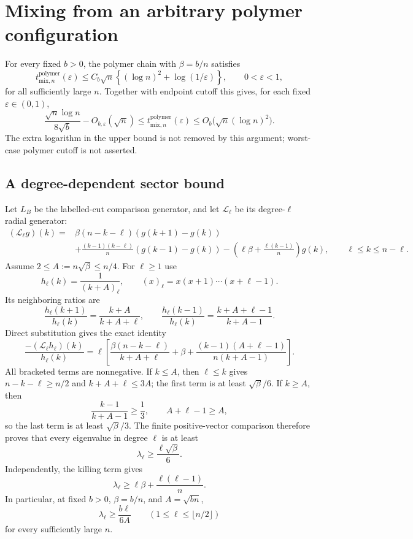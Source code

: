 
\section{Mixing from an arbitrary polymer configuration}\label{sec:full-polymer-tv}
\begin{theorem}\label{thm:full-polymer-tv-upper-new}
For every fixed $b>0$, the polymer chain with $\beta=b/n$ satisfies
\[
 t^{\mathrm{polymer}}_{\mathrm{mix},n}(\varepsilon)
 \leq C_b\sqrt n\left\{(\log n)^2+\log(1/\varepsilon)\right\},
 \qquad 0<\varepsilon<1,
\]
for all sufficiently large $n$. Together with endpoint cutoff this gives,
for each fixed $\varepsilon\in(0,1)$,
\[
 \frac{\sqrt n\log n}{8\sqrt b}-O_{b,\varepsilon}(\sqrt n)
 \leq t^{\mathrm{polymer}}_{\mathrm{mix},n}(\varepsilon)
 \leq O_b\bigl(\sqrt n(\log n)^2\bigr).
\]
The extra logarithm in the upper bound is not removed by this argument;
worst-case polymer cutoff is not asserted.
\end{theorem}

\subsection{A degree-dependent sector bound}
Let $L_B$ be the labelled-cut comparison generator, and let
$\mathcal L_\ell$ be its degree-$\ell$ radial generator:
\begin{align*}
 (\mathcal L_\ell g)(k)
 ={}&\beta(n-k-\ell)(g(k+1)-g(k))\\
 &+\frac{(k-1)(k-\ell)}n(g(k-1)-g(k))
 -\left(\ell\beta+\frac{\ell(k-1)}n\right)g(k),
 \qquad \ell\leq k\leq n-\ell.
\end{align*}
Assume $2\leq A:=n\sqrt\beta\leq n/4$. For $\ell\geq1$ use
\[
 h_\ell(k)=\frac1{(k+A)_\ell},\qquad
 (x)_\ell=x(x+1)\cdots(x+\ell-1).
\]
Its neighboring ratios are
\[
 \frac{h_\ell(k+1)}{h_\ell(k)}=\frac{k+A}{k+A+\ell},\qquad
 \frac{h_\ell(k-1)}{h_\ell(k)}=\frac{k+A+\ell-1}{k+A-1}.
\]
Direct substitution gives the exact identity
\begin{equation}\label{eq:degree-certificate-new}
 \frac{-(\mathcal L_\ell h_\ell)(k)}{h_\ell(k)}
 =\ell\left[
 \frac{\beta(n-k-\ell)}{k+A+\ell}+\beta
 +\frac{(k-1)(A+\ell-1)}{n(k+A-1)}\right].
\end{equation}
All bracketed terms are nonnegative. If $k\leq A$, then $\ell\leq k$
gives $n-k-\ell\geq n/2$ and $k+A+\ell\leq3A$; the first term is
at least $\sqrt\beta/6$. If $k\geq A$, then
\[
 \frac{k-1}{k+A-1}\geq\frac13,\qquad A+\ell-1\geq A,
\]
so the last term is at least $\sqrt\beta/3$.
The finite positive-vector comparison therefore proves that every
eigenvalue in degree $\ell$ is at least
\begin{equation}\label{eq:degree-linear-lower-new}
 \lambda_\ell\geq\frac{\ell\sqrt\beta}{6}.
\end{equation}
Independently, the killing term gives
\[
 \lambda_\ell\geq\ell\beta+\frac{\ell(\ell-1)}n.
\]
In particular, at fixed $b>0$, $\beta=b/n$, and $A=\sqrt{bn}$,
\[
 \lambda_\ell\geq \frac{b\ell}{6A}
 \qquad(1\leq\ell\leq\lfloor n/2\rfloor)
\]
for every sufficiently large $n$.


